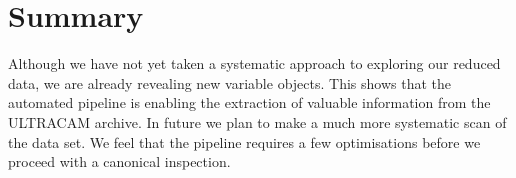   
\section{Summary}
Although we have not yet taken a systematic approach to exploring our reduced data, we are already revealing new variable objects. This shows that the automated pipeline is enabling the extraction of valuable information from the ULTRACAM archive. In future we plan to make a much more systematic scan of the data set. We feel that the pipeline requires a few optimisations before we proceed with a canonical inspection. 

